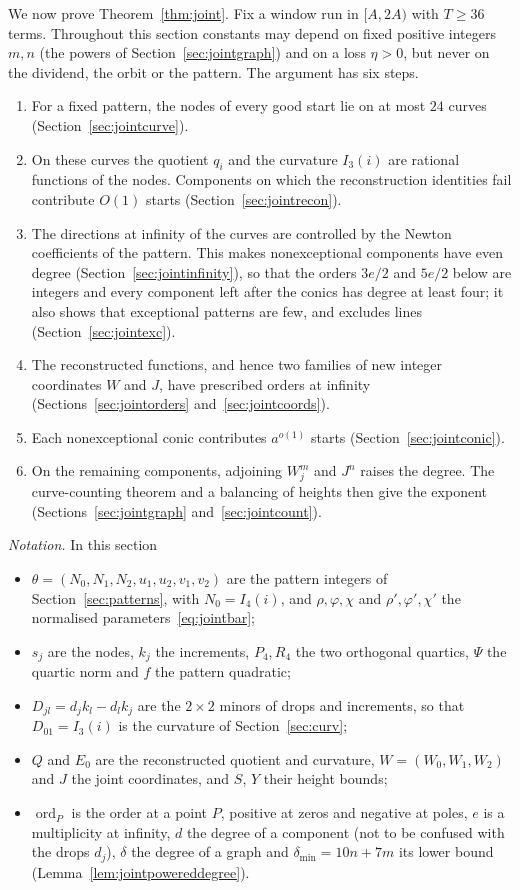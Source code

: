 \documentclass[11pt]{article}
\theoremstyle{definition}
\theoremstyle{remark}
\begin{document}
We now prove Theorem~\ref{thm:joint}. Fix a window run in $[A,2A)$ with $T\ge36$
terms. Throughout this section constants may depend on fixed positive integers
$m,n$ (the powers of Section~\ref{sec:jointgraph}) and on a loss $\eta>0$, but
never on the dividend, the orbit or the pattern. The argument has six steps.
\begin{enumerate}
\item For a fixed pattern, the nodes of every good start lie on at most
$24$ curves (Section~\ref{sec:jointcurve}).
\item On these curves the quotient $q_i$ and the curvature $I_3(i)$ are
rational functions of the nodes. Components on which the reconstruction
identities fail contribute $O(1)$ starts (Section~\ref{sec:jointrecon}).
\item The directions at infinity of the curves are controlled by the
Newton coefficients of the pattern. This makes nonexceptional
components have even degree (Section~\ref{sec:jointinfinity}), so that the
orders $3e/2$ and $5e/2$ below are integers and every component left after the
conics has degree at least four; it also shows
that exceptional patterns are few, and excludes lines
(Section~\ref{sec:jointexc}).
\item The reconstructed functions, and hence two families of new integer
coordinates $W$ and $J$, have prescribed orders at infinity
(Sections~\ref{sec:jointorders} and~\ref{sec:jointcoords}).
\item Each nonexceptional conic contributes $a^{o(1)}$ starts
(Section~\ref{sec:jointconic}).
\item On the remaining components, adjoining $W_j^m$ and $J^n$ raises the
degree. The curve-counting theorem and a balancing of heights then give the
exponent (Sections~\ref{sec:jointgraph} and~\ref{sec:jointcount}).
\end{enumerate}

\emph{Notation.} In this section
\begin{itemize}
\item $\theta=(N_0,N_1,N_2,u_1,u_2,v_1,v_2)$ are the pattern integers of
Section~\ref{sec:patterns}, with $N_0=I_4(i)$, and $\rho,\varphi,\chi$ and
$\rho',\varphi',\chi'$ the normalised parameters~\eqref{eq:jointbar};
\item $s_j$ are the nodes, $k_j$ the increments, $P_4,R_4$ the two orthogonal
quartics, $\Psi$ the quartic norm and $f$ the pattern quadratic;
\item $D_{jl}=d_jk_l-d_lk_j$ are the $2\times2$ minors of drops and increments, so that
$D_{01}=I_3(i)$ is the curvature of Section~\ref{sec:curv};
\item $Q$ and $E_0$ are the reconstructed quotient and curvature,
$W=(W_0,W_1,W_2)$ and $J$ the joint coordinates, and $S$, $Y$ their height
bounds;
\item $\operatorname{ord}_P$ is the order at a point $P$, positive at zeros and
negative at poles, $e$ is a multiplicity at infinity, $d$ the degree of a component (not to be
confused with the drops $d_j$),
$\delta$ the degree of a graph and $\delta_{\min}=10n+7m$ its lower bound
(Lemma~\ref{lem:jointpowereddegree}).
\end{itemize}
\end{document}
